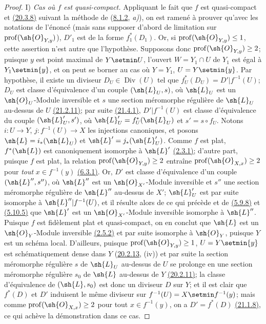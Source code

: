 \begin{proof}
\textup{I)} \emph{Cas où $f$ est quasi-compact.} Appliquant le fait que $f$
est quasi-compact et {\hyperlink{ega4.c04.prop.20-3-8}{(20.3.8)}}
suivant la méthode de ({\hyperref[canon-index.ega4.c04.statement.8-1-2]{8.1.2}},
\emph{a)}), on est ramené à prouver qu'avec les notations de l'énoncé (mais
sans supposer d'abord de limitation sur
$\operatorname{prof}(\sh{O}_{Y,y})$), $D'_1$ est de la forme
$f_1^*(D_1)$. Or, si $\operatorname{prof}(\sh{O}_{Y,y})\leq1$, cette
assertion n'est autre que l'hypothèse. Supposons donc
$\operatorname{prof}(\sh{O}_{Y,y})\geq2$; puisque $y$ est point maximal
de $Y\setmin U$, l'ouvert $W=Y_1\cap U$ de $Y_1$ est égal à $Y_1\setmin\{y\}$, et
on peut se borner au cas où $Y=Y_1$, $U=Y\setmin\{y\}$. Par hypothèse, il
existe un diviseur $D_U\in\operatorname{Div}(U)$ tel que
$f_U^*(D_U)=D'|f^{-1}(U)$; $D_U$ est classe d'équivalence d'un couple
$(\sh{L}_U,s)$, où $\sh{L}_U$ est un $\sh{O}_U$-Module inversible et
$s$ une section méromorphe régulière de $\sh{L}_U$ au-dessus de $U$
{\hyperlink{ega4.c04.prop.21-2-11}{(21.2.11)}}; par suite
{\hyperlink{ega4.c04.statement.21-4-1}{(21.4.1)}},
$D'|f^{-1}(U)$ est classe d'équivalence du couple
$(\sh{L}'_U,s')$, où
$\sh{L}'_U=f_U^*(\sh{L}_U)$ et $s'=s\circ f_U$.
Notons $i:U\to Y$, $j:f^{-1}(U)\to X$ les injections canoniques, et
posons
$\sh{L}=i_*(\sh{L}_U)$ et
$\sh{L}'=j_*(\sh{L}'_U)$.
Comme $f$ est plat, $f^*(\sh{L})$ est canoniquement isomorphe à
$\sh{L}'$ {\hyperref[canon-index.ega4.c04.lem.2-3-1]{(2.3.1)}}; d'autre part,
puisque $f$ est plat, la relation
$\operatorname{prof}(\sh{O}_{Y,y})\geq2$ entraîne
$\operatorname{prof}(\sh{O}_{X,x})\geq2$ pour \emph{tout} $x\in f^{-1}(y)$
{\hyperref[canon-index.ega4.c04.prop.6-3-1]{(6.3.1)}}.
Or, $D'$ est classe d'équivalence d'un couple $(\sh{L}'',s'')$, où
$\sh{L}''$ est un $\sh{O}_{X'}$-Module inversible et $s''$ une section
méromorphe régulière de $\sh{L}''$ au-dessus de $X'$; $\sh{L}'_U$ est
par suite isomorphe à $\sh{L}''|f^{-1}(U)$, et il résulte alors de ce
qui précède et de {\hyperref[canon-index.ega4.c04.prop.5-9-8]{(5.9.8)}} et
{\hyperref[canon-index.ega4.c04.thm.5-10-5]{(5.10.5)}} que $\sh{L}'$ est un
$\sh{O}_{X'}$-Module inversible isomorphe à $\sh{L}''$. Puisque $f$ est
fidèlement plat et quasi-compact, on en conclut que $\sh{L}$ est un
$\sh{O}_Y$-Module inversible
{\hyperref[canon-index.ega4.c04.prop.2-5-2]{(2.5.2)}} et par suite isomorphe à
$\sh{O}_Y$, puisque $Y$ est un schéma local. D'ailleurs, puisque
$\operatorname{prof}(\sh{O}_{Y,y})\geq1$, $U=Y\setmin\{y\}$ est
schématiquement dense dans $Y$
({\hyperlink{ega4.c04.statement.20-2-13}{20.2.13}}, (iv)) et par suite
la section méromorphe régulière $s$ de $\sh{L}_U$ au-dessus de $U$ se
prolonge en une section méromorphe régulière $s_0$ de $\sh{L}$
au-dessus de $Y$ {\hyperlink{ega4.c04.prop.20-2-11}{(20.2.11)}}; la
classe d'équivalence de $(\sh{L},s_0)$ est donc un diviseur $D$ sur
$Y$; et il est clair que $f^*(D)$ et $D'$ induisent le même diviseur sur
$f^{-1}(U)=X\setmin f^{-1}(y)$; mais comme
$\operatorname{prof}(\sh{O}_{X,x})\geq2$ pour tout $x\in f^{-1}(y)$,
on a $D'=f^*(D)$ {\hyperlink{ega4.c04.prop.21-1-8}{(21.1.8)}}, ce qui
achève la démonstration dans ce cas.


\end{proof}
